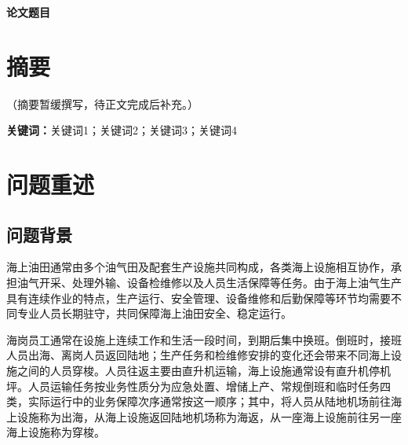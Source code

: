 \documentclass[UTF8,zihao=-4]{ctexart}
\numberwithin{figure}{section}
\numberwithin{table}{section}
\begin{document}
\begin{center}
  {\bfseries 论文题目}
\end{center}

\section*{摘要}

（摘要暂缓撰写，待正文完成后补充。）

\vspace{1em}
\noindent\textbf{关键词：}关键词1；关键词2；关键词3；关键词4

\clearpage


\section{问题重述}

\subsection{问题背景}

海上油田通常由多个油气田及配套生产设施共同构成，各类海上设施相互协作，承担油气开采、处理外输、设备检维修以及人员生活保障等任务。由于海上油气生产具有连续作业的特点，生产运行、安全管理、设备维修和后勤保障等环节均需要不同专业人员长期驻守，共同保障海上油田安全、稳定运行。

海岗员工通常在设施上连续工作和生活一段时间，到期后集中换班。倒班时，接班人员出海、离岗人员返回陆地；生产任务和检维修安排的变化还会带来不同海上设施之间的人员穿梭。人员往返主要由直升机运输，海上设施通常设有直升机停机坪。人员运输任务按业务性质分为应急处置、增储上产、常规倒班和临时任务四类，实际运行中的业务保障次序通常按这一顺序；其中，将人员从陆地机场前往海上设施称为出海，从海上设施返回陆地机场称为海返，从一座海上设施前往另一座海上设施称为穿梭。
\end{document}
